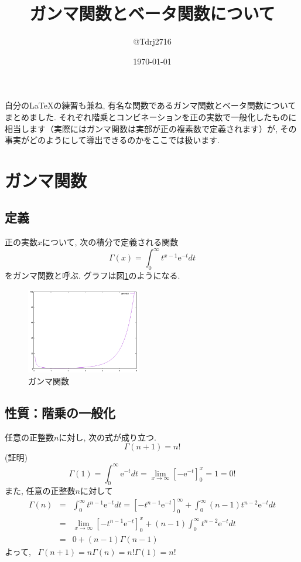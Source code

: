 \documentclass[a4paper,12pt,uplatex,dvipdfmx]{jsarticle}
\begin{document}
\title{ガンマ関数とベータ関数について}
\author{@Tdrj2716}
\date{\today}
\maketitle

自分の\LaTeX の練習も兼ね, 有名な関数であるガンマ関数とベータ関数についてまとめました. それぞれ階乗とコンビネーションを正の実数で一般化したものに相当します（実際にはガンマ関数は実部が正の複素数で定義されます）が, その事実がどのようにして導出できるのかをここでは扱います.

\section{ガンマ関数}
\subsection{定義}
正の実数$x$について, 次の積分で定義される関数
\[
  \Gamma(x) = \int_0^\infty t^{x-1}\mathrm{e}^{-t} dt
\]
をガンマ関数と呼ぶ. グラフは図\ref{fig:gamma}のようになる.
\begin{figure}
    \begin{center}
        \includegraphics[clip, width=5cm]{gamma.png}
        \caption{ガンマ関数}
        \label{fig:gamma}
    \end{center}
\end{figure}

\subsection{性質：階乗の一般化}
任意の正整数$n$に対し, 次の式が成り立つ.
\[
    \Gamma(n+1) = n!
\]
(証明)
\[
    \Gamma(1) = \int_0^\infty \mathrm{e}^{-t} dt = \lim_{x \to \infty} [-\mathrm{e}^{-t}]_0^x = 1 = 0!
\]
また, 任意の正整数$n$に対して 
\begin{eqnarray*}
    \Gamma(n) & = & \int_0^\infty t^{n-1}\mathrm{e}^{-t} dt = [-t^{n-1}\mathrm{e}^{-t}]_0^{\infty} + \int_0^\infty (n-1)t^{n-2}\mathrm{e}^{-t} dt \\
    & = & \lim_{x \to \infty}[-t^{n-1}\mathrm{e}^{-t}]_0^x + (n-1)\int_0^\infty t^{n-2}\mathrm{e}^{-t} dt \\
    & = & 0 + (n-1)\Gamma(n-1) 
\end{eqnarray*}
よって, ~$\Gamma(n+1) = n\Gamma(n) = n!\Gamma(1) = n!$
\end{document}
